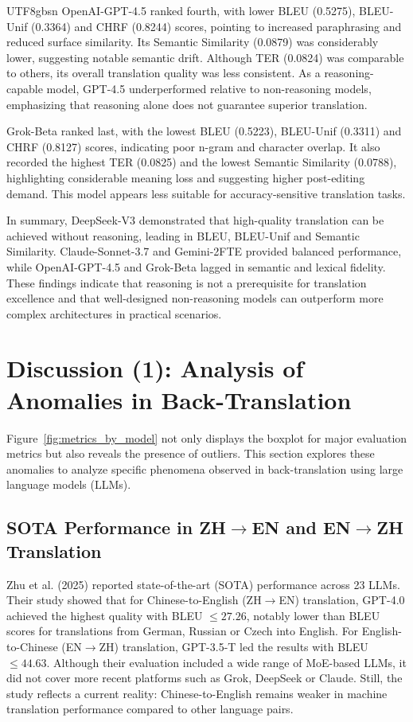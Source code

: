 \documentclass[conference]{IEEEtran}
\begin{document}
\begin{CJK}{UTF8}{gbsn}
OpenAI-GPT-4.5 ranked fourth, with lower BLEU (0.5275), BLEU-Unif (0.3364) and CHRF (0.8244) scores, pointing to increased paraphrasing and reduced surface similarity. Its Semantic Similarity (0.0879) was considerably lower, suggesting notable semantic drift. Although TER (0.0824) was comparable to others, its overall translation quality was less consistent. As a reasoning-capable model, GPT-4.5 underperformed relative to non-reasoning models, emphasizing that reasoning alone does not guarantee superior translation.

Grok-Beta ranked last, with the lowest BLEU (0.5223), BLEU-Unif (0.3311) and CHRF (0.8127) scores, indicating poor n-gram and character overlap. It also recorded the highest TER (0.0825) and the lowest Semantic Similarity (0.0788), highlighting considerable meaning loss and suggesting higher post-editing demand. This model appears less suitable for accuracy-sensitive translation tasks.

In summary, DeepSeek-V3 demonstrated that high-quality translation can be achieved without reasoning, leading in BLEU, BLEU-Unif and Semantic Similarity. Claude-Sonnet-3.7 and Gemini-2FTE provided balanced performance, while OpenAI-GPT-4.5 and Grok-Beta lagged in semantic and lexical fidelity. These findings indicate that reasoning is not a prerequisite for translation excellence and that well-designed non-reasoning models can outperform more complex architectures in practical scenarios.

\color{black}

\section{Discussion (1): Analysis of Anomalies in Back-Translation}

Figure~\ref{fig:metrics_by_model} not only displays the boxplot for major evaluation metrics but also reveals the presence of outliers. This section explores these anomalies to analyze specific phenomena observed in back-translation using large language models (LLMs).

\subsection{SOTA Performance in ZH$\rightarrow$EN and EN$\rightarrow$ZH Translation}

Zhu et al. (2025) \citep{zhu2025overcoming} reported state-of-the-art (SOTA) performance across 23 LLMs. Their study showed that for Chinese-to-English (ZH$\rightarrow$EN) translation, GPT-4.0 achieved the highest quality with BLEU $\leq 27.26$, notably lower than BLEU scores for translations from German, Russian or Czech into English. For English-to-Chinese (EN$\rightarrow$ZH) translation, GPT-3.5-T led the results with BLEU  $\leq 44.63$. Although their evaluation included a wide range of MoE-based LLMs, it did not cover more recent platforms such as Grok, DeepSeek or Claude. Still, the study reflects a current reality: Chinese-to-English remains weaker in machine translation performance compared to other language pairs.


\end{CJK}
\end{document}
